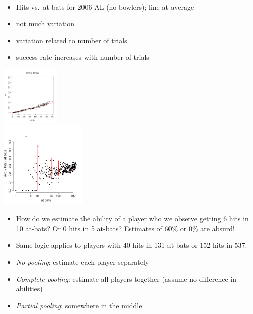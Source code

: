\documentclass[10pt]{report}
\begin{document}
%
\\
\begin{minipage}[t]{0.49\textwidth}
\small
\begin{itemize}
\item Hits vs.\ at bats for 2006 AL (no bowlers); line at average
\item not much variation
\item variation related to number of trials
\item success rate increases with number of trials
\end{itemize}
\end{minipage}
%
\begin{minipage}[t]{0.50\textwidth}
\begin{center}
\vspace*{-36pt}
\hfill \includegraphics[height=1.1in]{img/al06hitsvsatbats.png}
\\[-18pt]
\hfill \includegraphics[height=1.65in]{img/bball-eda.pdf}
\end{center}
\end{minipage}


%
\begin{itemize}
\item How do we estimate the ability of a player who we observe
  getting 6 hits in 10 at-bats?  Or 0 hits in 5 at-bats?  Estimates of
  60\% or 0\% are absurd!
\item Same logic applies to players with 40 hits in 131 at bats or 152 hits in 537.
\item \emph{No pooling}: estimate each player separately
\item \emph{Complete pooling}: estimate all players together (assume no difference
  in abilities)
\item \emph{Partial pooling}: somewhere in the middle
\end{itemize}
\end{document}
